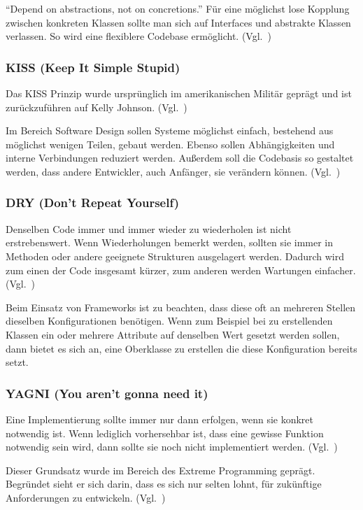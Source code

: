 \enquote{Depend on abstractions, not on concretions.}\cite{solid}
Für eine möglichst lose Kopplung zwischen konkreten Klassen sollte man sich auf Interfaces und abstrakte Klassen verlassen.
So wird eine flexiblere Codebase ermöglicht.
(Vgl.~\cite{design-patterns-php-laravel})

\subsubsection{KISS (Keep It Simple Stupid)}
Das KISS Prinzip wurde ursprünglich im amerikanischen Militär geprägt und ist zurückzuführen auf Kelly Johnson.
(Vgl.~\cite{kelly-johnson-memoir})

Im Bereich Software Design sollen Systeme möglichst einfach, bestehend aus möglichst wenigen Teilen, gebaut werden.
Ebenso sollen Abhängigkeiten und interne Verbindungen reduziert werden.
Außerdem soll die Codebasis so gestaltet werden, dass andere Entwickler, auch Anfänger, sie verändern können.
(Vgl.~\cite{kiss-principle-explained})

\subsubsection{DRY (Don’t Repeat Yourself)}
Denselben Code immer und immer wieder zu wiederholen ist nicht erstrebenswert.
Wenn Wiederholungen bemerkt werden, sollten sie immer in Methoden oder andere geeignete Strukturen ausgelagert werden.
Dadurch wird zum einen der Code insgesamt kürzer, zum anderen werden Wartungen einfacher.
(Vgl.~\cite{the-pragmatic-programmer})

Beim Einsatz von Frameworks ist zu beachten, dass diese oft an mehreren Stellen dieselben Konfigurationen benötigen.
Wenn zum Beispiel bei zu erstellenden Klassen ein oder mehrere Attribute auf denselben Wert gesetzt werden sollen, dann bietet es sich an, eine Oberklasse zu erstellen die diese Konfiguration bereits setzt.

\subsubsection{YAGNI (You aren't gonna need it)}
Eine Implementierung sollte immer nur dann erfolgen, wenn sie konkret notwendig ist.
Wenn lediglich vorhersehbar ist, dass eine gewisse Funktion notwendig sein wird, dann sollte sie noch nicht implementiert werden.
(Vgl.~\cite{extreme-programming-installed})

Dieser Grundsatz wurde im Bereich des Extreme Programming geprägt.
Begründet sieht er sich darin, dass es sich nur selten lohnt, für zukünftige Anforderungen zu entwickeln.
(Vgl.~\cite{kiss-principle-explained})

